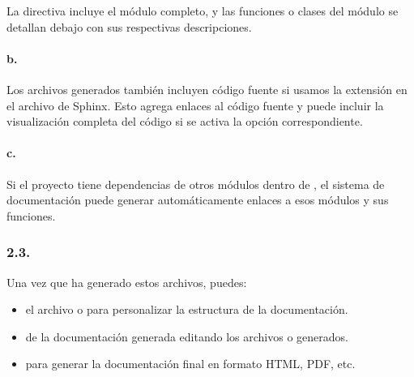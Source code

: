 \documentclass[a4paper,10pt,oneside,spanish,openany]{sphinxmanual}
\begin{document}
\sphinxAtStartPar
La directiva  incluye el módulo completo, y las funciones o clases del módulo se detallan debajo con sus respectivas descripciones.


\paragraph{b. }
\label{\detokenize{configuracion_inicial/007.Creacion_de_ficheros_de_codigo_y_generacion_automatica_de_documentacion:b-incluir-todo-el-codigo-del-proyecto}}
\sphinxAtStartPar
Los archivos generados también incluyen código fuente si usamos la extensión  en el archivo  de Sphinx. Esto agrega enlaces al código fuente y puede incluir la visualización completa del código si se activa la opción correspondiente.


\paragraph{c. }
\label{\detokenize{configuracion_inicial/007.Creacion_de_ficheros_de_codigo_y_generacion_automatica_de_documentacion:c-dependencias-de-modulos}}
\sphinxAtStartPar
Si el proyecto tiene dependencias de otros módulos dentro de , el sistema de documentación puede generar automáticamente enlaces a esos módulos y sus funciones.


\subsubsection{2.3. }
\label{\detokenize{configuracion_inicial/007.Creacion_de_ficheros_de_codigo_y_generacion_automatica_de_documentacion:uso-de-los-archivos-generados}}
\sphinxAtStartPar
Una vez que  ha generado estos archivos, puedes:
\begin{itemize}
\item {} 
\sphinxAtStartPar
{} el archivo  o  para personalizar la estructura de la documentación.

\item {} 
\sphinxAtStartPar
{} de la documentación generada editando los archivos  o  generados.

\item {} 
\sphinxAtStartPar
{} para generar la documentación final en formato HTML, PDF, etc.

\end{itemize}
\end{document}
